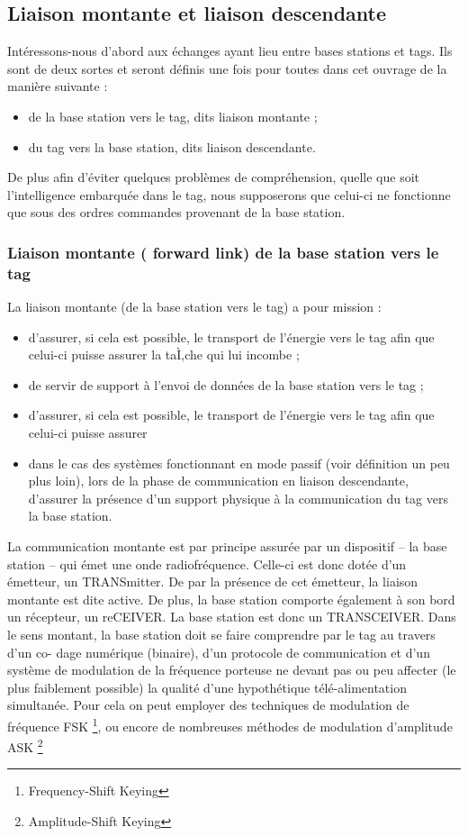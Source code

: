 \documentclass[11pt, a4paper, twoside]{book}
\begin{document}
\subsection{Liaison montante et liaison descendante}
Intéressons-nous d’abord aux échanges ayant lieu entre bases stations et tags. Ils sont de deux sortes et seront définis une fois pour toutes dans cet ouvrage de la manière suivante :
\begin{itemize}
\item de la base station vers le tag, dits liaison montante ;
\item du tag vers la base station, dits liaison descendante. \\
\end{itemize}
De plus afin d’éviter quelques problèmes de compréhension, quelle que soit l’intelligence embarquée dans le tag, nous supposerons que celui-ci ne fonctionne que sous des ordres commandes provenant de la base station. 
\subsubsection{Liaison montante ( forward link) de la base station vers le tag}
La liaison montante (de la base station vers le tag) a pour mission :
\begin{itemize}
\item d'assurer, si cela est possible, le transport de l'énergie vers le tag afin que celui-ci puisse assurer la taÌ‚che qui lui incombe ;
\item de servir de support à l'envoi de données de la base station vers le tag ;
\item d'assurer, si cela est possible, le transport de l'énergie vers le tag afin que celui-ci puisse assurer
\item dans le cas des systèmes fonctionnant en mode passif (voir définition un peu plus loin), lors de la phase de communication en liaison descendante, d'assurer la présence d'un support physique à la communication du tag vers la base station.
\end{itemize}
La communication montante est par principe assurée par un dispositif – la base station – qui émet une onde radiofréquence. Celle-ci est donc dotée d’un émetteur, un TRANSmitter. De par la présence de cet émetteur, la liaison montante est dite active. De plus, la base station comporte également à son bord un récepteur, un reCEIVER. La base station est donc un TRANSCEIVER. Dans le sens montant, la base station doit se faire comprendre par le tag au travers d’un co- dage numérique (binaire), d’un protocole de communication et d’un système de modulation de la fréquence porteuse ne devant pas ou peu affecter (le plus faiblement possible) la qualité d’une hypothétique télé-alimentation simultanée. Pour cela on peut employer des techniques de modulation de fréquence FSK \footnote{Frequency-Shift Keying}, ou encore de nombreuses méthodes de modulation d’amplitude ASK \footnote{Amplitude-Shift Keying}
\end{document}

